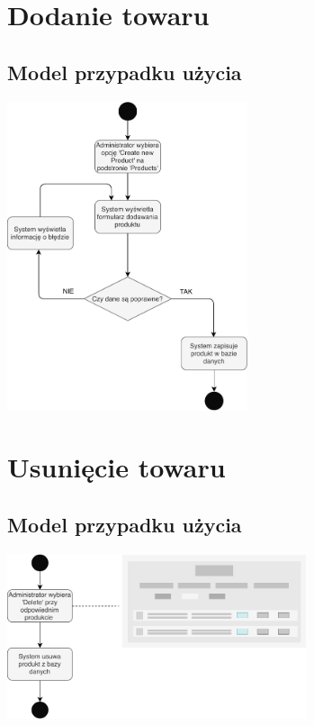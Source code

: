 \documentclass[10pt]{report}
\begin{document}
		
	\section{Dodanie towaru}
		\subsection{Model przypadku użycia}
			\begin{center}
				\includegraphics[width=200pt]{admin_dodaj.pdf}
			\end{center}
	
	\section{Usunięcie towaru}
		\subsection{Model przypadku użycia}
			\begin{center}
				\includegraphics[width=250pt]{usun.pdf}
			\end{center}
	
\end{document}
